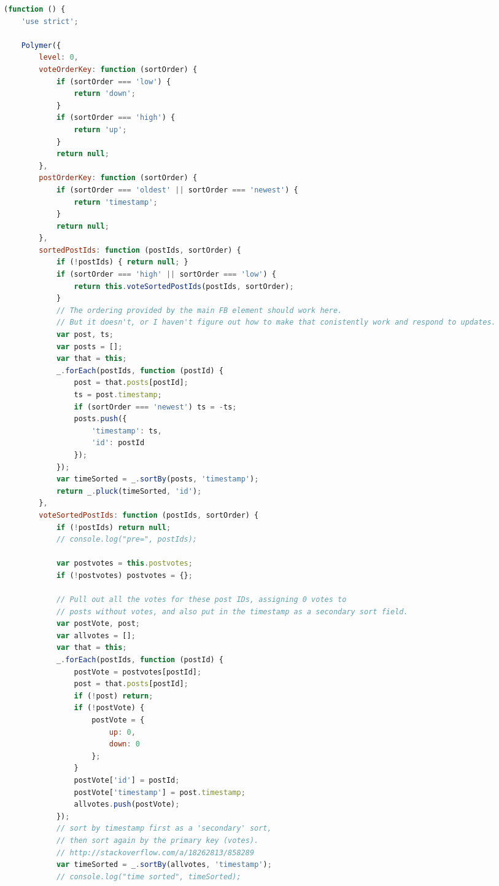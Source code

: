 \begin{changemargin}{-1cm}{-1.5cm}
\begin{lstlisting}[language=JavaScript,caption=
{\tcode{speakur-post-set.js}},label=l:appendix1b,captionpos=top]
(function () {
    'use strict';

    Polymer({
        level: 0,
        voteOrderKey: function (sortOrder) {
            if (sortOrder === 'low') {
                return 'down';
            }
            if (sortOrder === 'high') {
                return 'up';
            }
            return null;
        },
        postOrderKey: function (sortOrder) {
            if (sortOrder === 'oldest' || sortOrder === 'newest') {
                return 'timestamp';
            }
            return null;
        },
        sortedPostIds: function (postIds, sortOrder) {
            if (!postIds) { return null; }
            if (sortOrder === 'high' || sortOrder === 'low') {
                return this.voteSortedPostIds(postIds, sortOrder);
            }
            // The ordering provided by the main FB element should work here.
            // But it doesn't, or I haven't figure out how to make that conistently work and respond to updates.
            var post, ts;
            var posts = [];
            var that = this;
            _.forEach(postIds, function (postId) {
                post = that.posts[postId];
                ts = post.timestamp;
                if (sortOrder === 'newest') ts = -ts;
                posts.push({
                    'timestamp': ts,
                    'id': postId
                });
            });
            var timeSorted = _.sortBy(posts, 'timestamp');
            return _.pluck(timeSorted, 'id');
        },
        voteSortedPostIds: function (postIds, sortOrder) {
            if (!postIds) return null;
            // console.log("pre=", postIds);

            var postvotes = this.postvotes;
            if (!postvotes) postvotes = {};

            // Pull out all the votes for these post IDs, assigning 0 votes to
            // posts without votes, and also put in the timestamp as a secondary sort field.
            var postVote, post;
            var allvotes = [];
            var that = this;
            _.forEach(postIds, function (postId) {
                postVote = postvotes[postId];
                post = that.posts[postId];
                if (!post) return;
                if (!postVote) {
                    postVote = {
                        up: 0,
                        down: 0
                    };
                }
                postVote['id'] = postId;
                postVote['timestamp'] = post.timestamp;
                allvotes.push(postVote);
            });
            // sort by timestamp first as a 'secondary' sort,
            // then sort again by the primary key (votes).
            // http://stackoverflow.com/a/18262813/858289
            var timeSorted = _.sortBy(allvotes, 'timestamp');
            // console.log("time sorted", timeSorted);


\end{lstlisting}
\end{changemargin}
